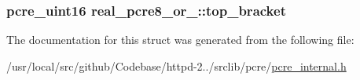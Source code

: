 \subsubsection[{\texorpdfstring{top\+\_\+bracket}{top_bracket}}]{\setlength{\rightskip}{0pt plus 5cm}pcre\+\_\+uint16 real\+\_\+pcre8\+\_\+or\+\_\+::top\+\_\+bracket}\hypertarget{structreal__pcre8__or__16_aa3d9e64918a0c439deb9fb8d8b619926}{}\label{structreal__pcre8__or__16_aa3d9e64918a0c439deb9fb8d8b619926}


The documentation for this struct was generated from the following file\+:\begin{DoxyCompactItemize}
\item 
/usr/local/src/github/\+Codebase/httpd-\/2../srclib/pcre/\hyperlink{pcre__internal_8h}{pcre\+\_\+internal.\+h}\end{DoxyCompactItemize}
